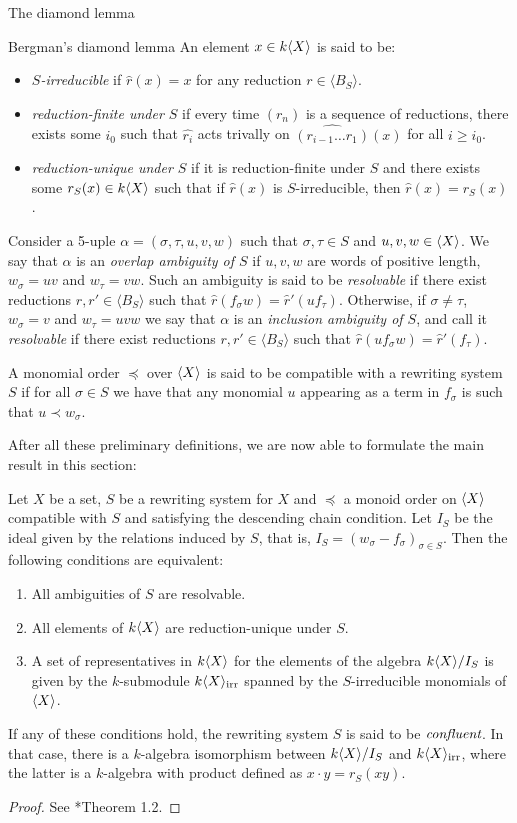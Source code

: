 \begin{chapter}{The diamond lemma}
\begin{section}{Bergman's diamond lemma}
An element $x\in k\langle X\rangle$ is said to be:
\begin{itemize}
\item \emph{$S$-irreducible} if $\hat{r}(x)=x$ for any reduction $r\in\langle B_S\rangle$.
\item \emph{reduction-finite under $S$} if every time $(r_n)$ is a sequence of reductions, there exists some $i_0$ such that $\hat{r_i}$ acts trivally on $\widehat{({r_{i-1}}\dots r_1)}(x)$ for all $i\geq i_0$.
\item \emph{reduction-unique under $S$} if it is reduction-finite under $S$ and there exists some $r_S(x)\in k\langle X\rangle$ such that if $\hat{r}(x)$ is $S$-irreducible, then $\hat{r}(x) = r_S(x)$.
\end{itemize}

Consider a 5-uple $\alpha=(\sigma, \tau, u,v,w)$ such that $\sigma,\tau\in S$ and $u,v,w\in \langle X\rangle$. We say that $\alpha$ is an \emph{overlap ambiguity of $S$} if $u,v,w$ are words of positive length, $w_\sigma =uv$ and $w_\tau=vw$. Such an ambiguity is said to be \emph{resolvable} if there exist reductions $r,r'\in \langle B_S\rangle$ such that $\hat{r}(f_\sigma w)=\hat{r}'(uf_\tau)$. Otherwise, if $\sigma\neq \tau$, $w_\sigma=v$ and $w_\tau=uvw$ we say that $\alpha$ is an \emph{inclusion ambiguity of $S$}, and call it \emph{resolvable} if there exist reductions $r,r'\in \langle B_S\rangle$ such that $\hat{r}(uf_\sigma w)=\hat{r}'(f_\tau)$.

A monomial order $\preceq$ over $\langle X\rangle$ is said to be compatible with a rewriting system $S$ if for all $\sigma \in S$ we have that any monomial $u$ appearing as a term in $f_\sigma$ is such that $u \prec w_\sigma$.

After all these preliminary definitions, we are now able to formulate the main result in this section:

\begin{thm} Let $X$ be a set, $S$ be a rewriting system for $X$ and $\preceq$ a monoid order on $\langle X\rangle$ compatible with $S$ and satisfying the descending chain condition. Let $I_S$ be the ideal given by the relations induced by $S$, that is, $I_S=(w_\sigma-f_\sigma)_{\sigma\in S}$. Then the following conditions are equivalent:
\begin{enumerate}
\item All ambiguities of $S$ are resolvable.
\item All elements of $k\langle X\rangle$ are reduction-unique under $S$.
\item A set of representatives in $k\langle X\rangle$ for the elements of the algebra $k\langle X\rangle/I_S$ is given by the $k$-submodule $k\langle X\rangle_{\mathrm{irr}}$ spanned by the $S$-irreducible monomials of $\langle X\rangle$.
\end{enumerate}
If any of these conditions hold, the rewriting system $S$ is said to be $\emph{confluent}$. In that case, there is a $k$-algebra isomorphism between $k\langle X\rangle/I_S$ and $k\langle X\rangle_{\mathrm{irr}}$, where the latter is a $k$-algebra with product defined as $x\cdot y= r_S(xy)$.
\end{thm}
\begin{proof} See {\cite{Ber78}*{Theorem 1.2}}.
\end{proof}


\end{section}
\end{chapter}
